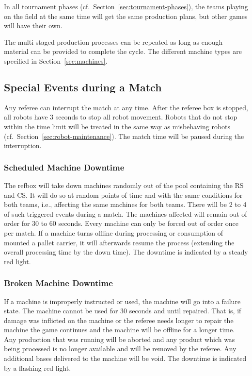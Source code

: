 \documentclass[12pt,twoside]{article}
\newcommand{\refsec}[1]{Section~\ref{#1}}
\begin{document}
In all tournament phases (cf.~\refsec{sec:tournament-phases}), the
teams playing on the field at the same time will get the same
production plans, but other games will have their own.

The multi-staged production processes can be repeated as long as
enough material can be provided to complete the cycle. The different
machine types are specified in Section~\ref{sec:machines}.

\subsection{Special Events during a Match}
\label{sec:during-match}
Any referee can interrupt the match at any time. After the referee box
is stopped, all robots have 3 seconds to stop all robot movement.
Robots that do not stop within the time limit will be treated in the
same way as misbehaving robots (cf.~\refsec{sec:robot-maintenance}).
The match time will be paused during the interruption.

\subsubsection{Scheduled Machine Downtime}
\label{sec:out-of-order}
The refbox will take down machines randomly out of the pool containing
the RS and CS. It will do so at random points of time and with the
same conditions for both teams, i.e., affecting the same machines for
both teams. There will be 2 to 4 of such triggered events during a
match. The machines affected will remain out of order for 30 to 60
seconds. Every machine can only be forced out of order once per
match. If a machine turns offline during processing or consumption of
mounted a pallet carrier, it will afterwards resume the process
(extending the overall processing time by the down time). The downtime
is indicated by a steady red light.

\subsubsection{Broken Machine Downtime}
\label{sec:broken-machine}
If a machine is improperly instructed or used, the machine will go
into a failure state. The machine cannot be used for 30 seconds and
until repaired. That is, if damage was inflicted on the machine or the
referee needs longer to repair the machine the game continues and the
machine will be offline for a longer time. Any production that was
running will be aborted and any product which was being processed is
no longer available and will be removed by the referee. Any additional
bases delivered to the machine will be void. The downtime is indicated
by a flashing red light.
\end{document}
